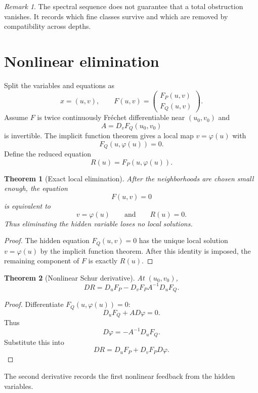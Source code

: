 \documentclass{aomart}
\newtheorem{theorem}{Theorem}[section]
\theoremstyle{definition}
\theoremstyle{remark}
\newtheorem{remark}[remark]{Remark}
\begin{document}
\begin{remark}\label{rem:spectral_sequence_meaning}
The spectral sequence does not guarantee that a total obstruction vanishes.  It records which fine classes survive and which are removed by compatibility across depths.
\end{remark}

\section{Nonlinear elimination}\label{sec:nonlinear_elimination}

Split the variables and equations as
\[
x=(u,v),
\qquad
F(u,v)=
\begin{pmatrix}
F_P(u,v)\\
F_Q(u,v)
\end{pmatrix}.
\]
Assume $F$ is twice continuously Fr\'echet differentiable near $(u_0,v_0)$ and
\[
A=D_vF_Q(u_0,v_0)
\]
is invertible.  The implicit function theorem gives a local map $v=\varphi(u)$ with
\[
F_Q(u,\varphi(u))=0.
\]
Define the reduced equation
\[
R(u)=F_P(u,\varphi(u)).
\]

\begin{theorem}[Exact local elimination]\label{thm:exact_local_elimination}
After the neighborhoods are chosen small enough, the equation
\[
F(u,v)=0
\]
is equivalent to
\[
v=\varphi(u)
\qquad\text{and}\qquad
R(u)=0.
\]
Thus eliminating the hidden variable loses no local solutions.
\end{theorem}

\begin{proof}
The hidden equation $F_Q(u,v)=0$ has the unique local solution $v=\varphi(u)$ by the implicit function theorem.  After this identity is imposed, the remaining component of $F$ is exactly $R(u)$.
\end{proof}

\begin{theorem}[Nonlinear Schur derivative]\label{thm:schur_derivative}
At $(u_0,v_0)$,
\[
DR
=
D_uF_P
-
D_vF_P A^{-1}D_uF_Q.
\]
\end{theorem}

\begin{proof}
Differentiate $F_Q(u,\varphi(u))=0$:
\[
D_uF_Q+A D\varphi=0.
\]
Thus
\[
D\varphi=-A^{-1}D_uF_Q.
\]
Substitute this into
\[
DR=D_uF_P+D_vF_PD\varphi.
\]
\end{proof}

The second derivative records the first nonlinear feedback from the hidden variables.
\end{document}
